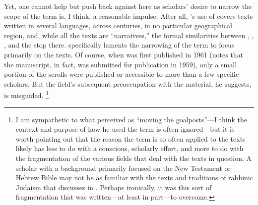 Yet, one cannot help but push back against \vermes here as scholars' desire to narrow the scope of the term is, I think, a reasonable impulse. After all, \vermes's use of \rwb covers texts written in several languages, across centuries, in no particular geographical region, and, while all the texts are ``narratives,'' the formal similarities between \ga, \ant, \jub, and the \pTarg stop there. \vermes specifically laments the narrowing of the term \rwb to focus primarily on the \dss texts. Of course, when  was first published in 1961 (\vermes notes that the manuscript, in fact, was submitted for publication in 1959), only a small portion of the scrolls were published or accessible to more than a few specific scholars. But the field's subsequent preoccupation with the \qumran material, he suggests, is misguided.%
    \footnote{I am sympathetic to what \vermes perceived as ``moving the goalposts''---I think the context and purpose of how he used the term \rwb is often ignored---but it is worth pointing out that the reason the term \rwb is so often applied to the \qumran texts likely has less to do with a conscious, scholarly effort, and more to do with the fragmentation of the various fields that deal with the texts in question. A scholar with a background primarily focused on the New Testament or Hebrew Bible may not be as familiar with the texts and traditions of rabbinic Judaism that \vermes discusses in . Perhaps ironically, it was this sort of fragmentation that  was written---at least in part---to overcome.} 

